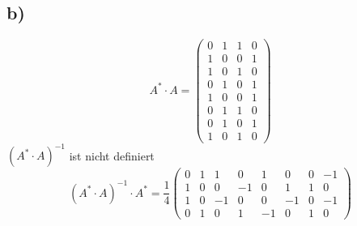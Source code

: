 \documentclass[10pt,a4paper]{article}
\begin{document}
\subsection*{b)}
$$A^* \cdot A = \begin{pmatrix}
    0&1&1&0\\
    1&0&0&1\\
    1&0&1&0\\
    0&1&0&1\\
    1&0&0&1\\
    0&1&1&0\\
    0&1&0&1\\
    1&0&1&0
\end{pmatrix}$$
$(A^* \cdot A)^{-1}$ ist nicht definiert
$$(A^* \cdot A)^{-1} \cdot A^* = \frac{1}{4}\begin{pmatrix}
    0&1&1&0&1&0&0&-1\\
    1&0&0&-1&0&1&1&0\\
    1&0&-1&0&0&-1&0&-1\\
    0&1&0&1&-1&0&1&0
\end{pmatrix}$$
\end{document}
